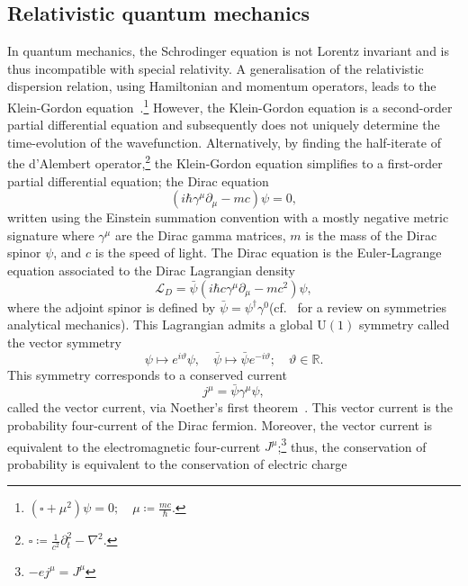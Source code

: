 \documentclass[11pt, a4paper]{article}
\begin{document}
\subsection{Relativistic quantum mechanics}
In quantum mechanics, the Schrodinger equation is not Lorentz invariant and is thus
incompatible with special relativity. A generalisation of the relativistic
dispersion relation, using Hamiltonian and momentum operators, leads to the Klein-Gordon
equation~\cite{Klein-tran, Gordon1926}.\footnote{$(\square + \mu^2)\psi = 0; \quad \mu \coloneq \frac{mc}{\hbar}$.}
However, the Klein-Gordon equation is a second-order partial differential equation and
subsequently does not uniquely determine the time-evolution of the wavefunction.
Alternatively, by finding the half-iterate of the d'Alembert
operator,\footnote{$\square \coloneq \frac{1}{c^2}\partial^2_t - \nabla^2$.} the 
Klein-Gordon equation simplifies to a first-order partial differential equation;
the Dirac equation~\cite{dirac1958}
\begin{equation}
  (i\hbar\gamma^\mu\partial_\mu - mc)\psi = 0,
\end{equation}
written using the Einstein summation convention with a
mostly negative metric signature where $\gamma^\mu$
are the Dirac gamma matrices, $m$ is the mass of the Dirac spinor $\psi$,
and $c$ is the speed of light.
The Dirac equation is the Euler-Lagrange equation associated to the Dirac Lagrangian density
\begin{equation}
  \mathcal{L}_D = \bar{\psi}(i\hbar c \gamma^\mu\partial_\mu - mc^2)\psi,
\end{equation}
where the adjoint spinor is defined by
$\bar{\psi} = \psi^\dagger \gamma^0$(cf.~\cite{KofiEthan} for a review on symmetries analytical
mechanics).
This Lagrangian admits a global $\mathrm{U}(1)$ symmetry called the vector symmetry
\begin{equation}
  \psi \mapsto e^{i\vartheta}\psi, \quad \bar{\psi} \mapsto \bar{\psi}e^{-i\vartheta};
  \quad \vartheta \in \mathbb{R}.
\end{equation}
This symmetry corresponds to a conserved current
\begin{equation}
  j^\mu = \bar{\psi}\gamma^\mu\psi,
\end{equation}
called the vector current, via Noether's first theorem~\cite{NoetherTran}.
This vector current is the probability four-current of the Dirac fermion.
Moreover, the vector current is equivalent to the electromagnetic four-current
$J^\mu$;\footnote{$-e j^\mu = J^\mu$}
thus, the conservation of probability is equivalent to the conservation of electric charge
\end{document}
